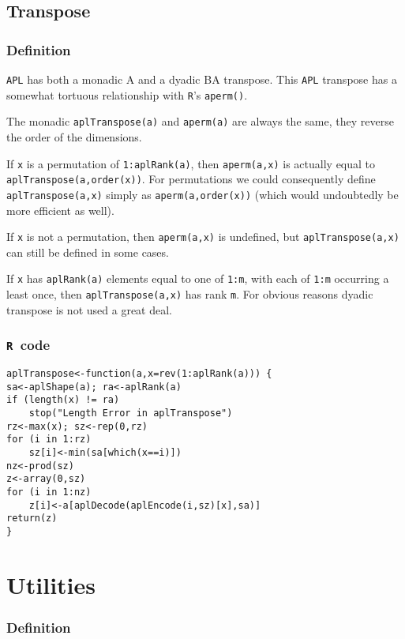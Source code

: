 \documentclass[11pt]{amsart}
\theoremstyle{plain}
\theoremstyle{definition}
\theoremstyle{remark}
\newcommand{\tR}{\texttt{R}}
\begin{document}
\subsection{Transpose} 
\subsubsection{Definition}
\texttt{APL} has both a monadic {\apl\qtran A} and a dyadic {\apl B\qtran A} transpose. This \texttt{APL} transpose has a somewhat tortuous relationship
with \texttt{R}'s \texttt{aperm()}. 

The monadic \texttt{aplTranspose(a)} and
\texttt{aperm(a)} are always the same, they reverse the order of the 
dimensions.  

If \lstinline{x} is a permutation
of \lstinline{1:aplRank(a)}, then \lstinline{aperm(a,x)} is
actually equal to \lstinline{aplTranspose(a,order(x))}. 
For
permutations we could consequently define
\lstinline{aplTranspose(a,x)} simply as \lstinline{aperm(a,order(x))} (which would undoubtedly be more efficient as well).

If \lstinline{x} is not
a permutation, then \lstinline{aperm(a,x)} is undefined, but
\lstinline{aplTranspose(a,x)} can still be defined in some 
cases. 

If \lstinline{x} has \lstinline{aplRank(a)} elements equal to
one of \lstinline{1:m},  with each of \lstinline{1:m}
occurring a least once, then \lstinline{aplTranspose(a,x)}
has rank \lstinline{m}. For obvious reasons dyadic
transpose is not used a great deal. 

\subsubsection{\tR\ code}\quad
\begin{lstlisting}
aplTranspose<-function(a,x=rev(1:aplRank(a))) {
sa<-aplShape(a); ra<-aplRank(a)
if (length(x) != ra)
    stop("Length Error in aplTranspose")
rz<-max(x); sz<-rep(0,rz)
for (i in 1:rz)
    sz[i]<-min(sa[which(x==i)])
nz<-prod(sz)
z<-array(0,sz)
for (i in 1:nz)
    z[i]<-a[aplDecode(aplEncode(i,sz)[x],sa)]
return(z)
}
\end{lstlisting}

\section{Utilities}\quad
\subsubsection{Definition}
\end{document}

